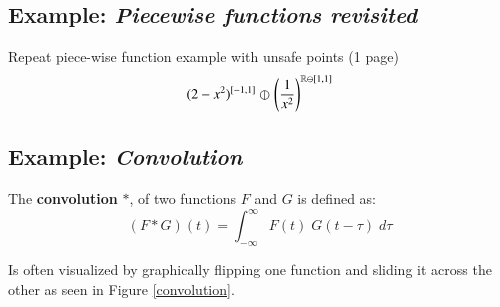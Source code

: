 \subsection{Example: \emph{Piecewise functions revisited}}
Repeat piece-wise function example with unsafe points (1 page)
\begin{equation}
(2-x^2)^{[-1,1]} \varobar^{} \left( \frac{1}{x^2} \right)^{\mathbb{R} \ominus [1,1]}
\end{equation}


\subsection{Example: \emph{Convolution}}


\begin{definition}
	The \textbf{convolution} $*$, of two functions $F$ and $G$ is defined as:
	\begin{equation}
		(F*G)(t) = \int_{-\infty}^\infty F(t) \;G(t - \tau) \; d\tau
	\end{equation}
\end{definition}

Is often visualized by graphically flipping one function and sliding it across the other as seen in Figure \ref{convolution}.

